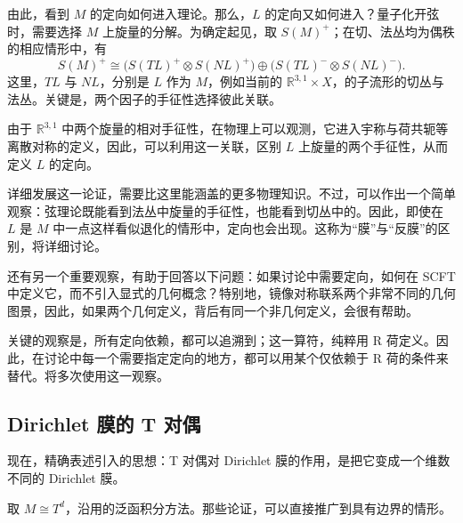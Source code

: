 由此，看到 $M$ 的定向如何进入理论。那么，$L$ 的定向又如何进入？量子化开弦时，需要选择 $M$ 上旋量的分解。为确定起见，取 $S(M)^+$；在切、法丛均为偶秩的相应情形中，有
\[
S(M)^+\cong
\bigl(S(TL)^+\otimes S(NL)^+\bigr)
\oplus\bigl(S(TL)^-\otimes S(NL)^-\bigr).
\]
这里，$TL$ 与 $NL$，分别是 $L$ 作为 $M$，例如当前的 $\mathbb{R}^{3,1}\times X$，的子流形的切丛与法丛。关键是，两个因子的手征性选择彼此关联。

由于 $\mathbb{R}^{3,1}$ 中两个旋量的相对手征性，在物理上可以观测，它进入宇称与荷共轭等离散对称的定义，因此，可以利用这一关联，区别 $L$ 上旋量的两个手征性，从而定义 $L$ 的定向。

详细发展这一论证，需要比这里能涵盖的更多物理知识。不过，可以作出一个简单观察：弦理论既能看到法丛中旋量的手征性，也能看到切丛中的。因此，即使在 $L$ 是 $M$ 中一点这样看似退化的情形中，定向也会出现。这称为“膜”与“反膜”的区别，将详细讨论。

还有另一个重要观察，有助于回答以下问题：如果讨论中需要定向，如何在 SCFT 中定义它，而不引入显式的几何概念？特别地，镜像对称联系两个非常不同的几何图景，因此，如果两个几何定义，背后有同一个非几何定义，会很有帮助。

关键的观察是，所有定向依赖，都可以追溯到；这一算符，纯粹用 R 荷定义。因此，在讨论中每一个需要指定定向的地方，都可以用某个仅依赖于 R 荷的条件来替代。将多次使用这一观察。

\subsection{Dirichlet 膜的 T 对偶}\label{sec:3.5.4}

现在，精确表述引入的思想：T 对偶对 Dirichlet 膜的作用，是把它变成一个维数不同的 Dirichlet 膜。

取 $M\cong T^d$，沿用的泛函积分方法。那些论证，可以直接推广到具有边界的情形。

